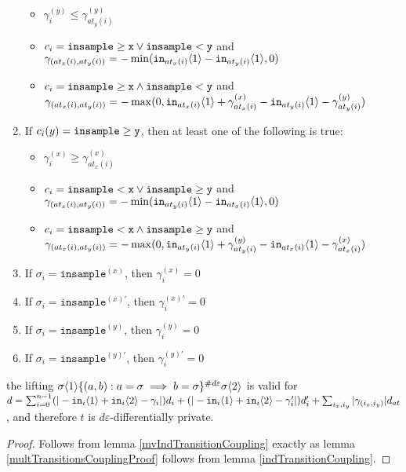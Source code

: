 \begin{lemma}
\begin{enumerate}
\begin{itemize}
            \item $\gamma_i^{(y)}\leq \gamma^{(y)}_{at_y(i)}$
            \item $c_i = \gguard[\texttt{x}]\lor\lguard[\texttt{y}]$ and $\gamma_{(at_x(i), at_y(i))} = -\min(\texttt{in}_{at_x(i)}\brangle{1}-\texttt{in}_{at_y(i)}\brangle{1}, 0)$
            \item $c_i = \gguard[\texttt{x}]\land\lguard[\texttt{y}]$ and $\gamma_{(at_x(i), at_y(i))} = -\max(0, \texttt{in}_{at_x(i)}\brangle{1}+ \gamma_{at_x(i)}^{(x)}-\texttt{in}_{at_y(i)}\brangle{1}-\gamma_{at_y(i)}^{(y)})$
        \end{itemize}
        \item If $c_i(y) = \gguard[\texttt{y}]$, then at least one of the following is true: \begin{itemize}
            \item $\gamma_i^{(x)}\geq \gamma^{(x)}_{at_x(i)}$
            \item $c_i = \lguard[\texttt{x}]\lor\gguard[\texttt{y}]$ and $\gamma_{(at_x(i), at_y(i))} = -\min(\texttt{in}_{at_y(i)}\brangle{1}-\texttt{in}_{at_x(i)}\brangle{1}, 0)$
            \item $c_i = \lguard[\texttt{x}]\land\gguard[\texttt{y}]$ and $\gamma_{(at_x(i), at_y(i))} = -\max(0, \texttt{in}_{at_y(i)}\brangle{1}+ \gamma_{at_y(i)}^{(y)}-\texttt{in}_{at_x(i)}\brangle{1}-\gamma_{at_x(i)}^{(x)})$
        \end{itemize}
        \item If $\sigma_i = \texttt{insample}^{(x)}$, then $\gamma_i^{(x)}=0$
        \item If $\sigma_i = \texttt{insample}^{(x)\prime}$, then $\gamma_i^{(x)\prime}=0$
        \item If $\sigma_i = \texttt{insample}^{(y)}$, then $\gamma_i^{(y)}=0$
        \item If $\sigma_i = \texttt{insample}^{(y)\prime}$, then $\gamma_i^{(y)\prime}=0$
    \end{enumerate}
      the lifting $\sigma\brangle{1}\{(a, b): a=\sigma\implies b=\sigma\}^{\#d\varepsilon}\sigma\brangle{2}$ is valid for $d = \sum_{i=0}^{n-1}(|-\texttt{in}_i\brangle{1}+\texttt{in}_i\brangle{2}-\gamma_i|)d_i+(|-\texttt{in}_i\brangle{1}+\texttt{in}_i\brangle{2}-\gamma_i'|)d_i' + \sum_{i_x, i_y}|\gamma_{(i_x, i_y)}|d_{at}$, and therefore $t$ is $d\varepsilon$-differentially private. 
\end{lemma}
\begin{proof}
    Follows from lemma \ref{mvIndTransitionCoupling} exactly as lemma \ref{multTransitionsCouplingProof} follows from lemma \ref{indTransitionCoupling}.
\end{proof}

